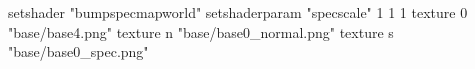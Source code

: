 setshader "bumpspecmapworld"
setshaderparam "specscale" 1 1 1
   texture 0 "base/base4.png"
   texture n "base/base0_normal.png"
   texture s "base/base0_spec.png"